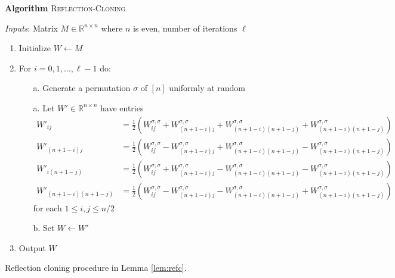 \begin{figure}[t!]
\begin{algbox}
\textbf{Algorithm} \textsc{Reflection-Cloning}

\vspace{2mm}

\textit{Inputs}: Matrix $M \in \mathbb{R}^{n \times n}$ where $n$ is even, number of iterations $\ell$
\begin{enumerate}
\item Initialize $W \gets M$
\item For $i = 0, 1, \dots, \ell - 1$ do:
\begin{enumerate}
\item[a.] Generate a permutation $\sigma$ of $[n]$ uniformly at random
\item[a.] Let $W' \in \mathbb{R}^{n \times n}$ have entries
\begin{align*}
W'_{ij} &= \frac{1}{2} \left( W_{ij}^{\sigma, \sigma} + W_{(n+1-i)j}^{\sigma, \sigma} + W_{(n+1-i)(n+1-j)}^{\sigma, \sigma} + W_{(n+1-i)(n+1-j)}^{\sigma, \sigma} \right) \\
W'_{(n+1-i)j} &= \frac{1}{2} \left( W_{ij}^{\sigma, \sigma} - W_{(n+1-i)j}^{\sigma, \sigma} + W_{(n+1-i)(n+1-j)}^{\sigma, \sigma} - W_{(n+1-i)(n+1-j)}^{\sigma, \sigma} \right) \\
W'_{i(n+1-j)} &= \frac{1}{2} \left( W_{ij}^{\sigma, \sigma} + W_{(n+1-i)j}^{\sigma, \sigma} - W_{(n+1-i)(n+1-j)}^{\sigma, \sigma} - W_{(n+1-i)(n+1-j)}^{\sigma, \sigma} \right) \\
W'_{(n+1-i)(n+1-j)} &= \frac{1}{2} \left( W_{ij}^{\sigma, \sigma} - W_{(n+1-i)j}^{\sigma, \sigma} - W_{(n+1-i)(n+1-j)}^{\sigma, \sigma} + W_{(n+1-i)(n+1-j)}^{\sigma, \sigma} \right)
\end{align*}
for each $1 \le i, j \le n/2$
\item[b.] Set $W \gets W'$
\end{enumerate}
\item Output $W$
\end{enumerate}
\vspace{1mm}
\end{algbox}
\caption{Reflection cloning procedure in Lemma \ref{lem:refc}.}
\end{figure}

